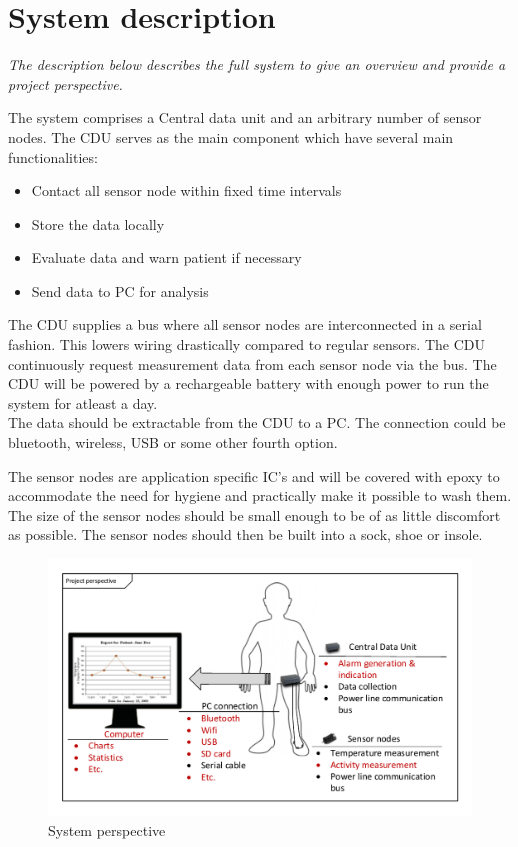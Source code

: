 \chapter{System description}
\textit{The description below describes the full system to give an overview and provide a project perspective.}

The system comprises a Central data unit and an arbitrary number of sensor nodes. The CDU serves as the main component which have several main functionalities:
\begin{itemize}
	\item Contact all sensor node within fixed time intervals
	\item Store the data locally
	\item Evaluate data and warn patient if necessary
	\item Send data to PC for analysis
\end{itemize}
The CDU supplies a bus where all sensor nodes are interconnected in a serial fashion. This lowers wiring drastically compared to regular sensors.
The CDU continuously request measurement data from each sensor node via the bus. The CDU will be powered by a rechargeable battery with enough power to run the system for atleast a day.\\
The data should be extractable from the CDU to a PC. The connection could be bluetooth, wireless, USB or some other fourth option.

The sensor nodes are application specific IC's and will be covered with epoxy to accommodate the need for hygiene and practically make it possible to wash them. The size of the sensor nodes should be small enough to be of as little discomfort as possible. The sensor nodes should then be built into a sock, shoe or insole.
\begin{figure}[H]
	\centering
	\includegraphics[width=.7\textwidth]{billeder/6Systemdescription/fullsystem_vector}
	\caption{System perspective}
	\label{fig:full_system}
\end{figure}
